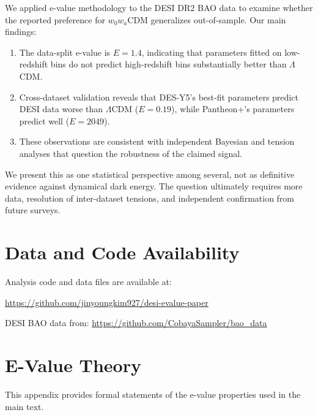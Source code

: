 \documentclass[11pt,a4paper]{article}
\newcommand{\LCDM}{$\Lambda$CDM}
\begin{document}
We applied e-value methodology to the DESI DR2 BAO data to examine whether the reported preference for $w_0w_a$CDM generalizes out-of-sample. Our main findings:

\begin{enumerate}
    \item The data-split e-value is $E = 1.4$, indicating that parameters fitted on low-redshift bins do not predict high-redshift bins substantially better than \LCDM.

    \item Cross-dataset validation reveals that DES-Y5's best-fit parameters predict DESI data worse than \LCDM{} ($E = 0.19$), while Pantheon+'s parameters predict well ($E = 2049$).

    \item These observations are consistent with independent Bayesian \citep{OngBayesian2025} and tension \citep{WangMota2025} analyses that question the robustness of the claimed signal.
\end{enumerate}

We present this as one statistical perspective among several, not as definitive evidence against dynamical dark energy. The question ultimately requires more data, resolution of inter-dataset tensions, and independent confirmation from future surveys.

\section*{Data and Code Availability}

Analysis code and data files are available at:
\begin{center}
\url{https://github.com/jinyoungkim927/desi-evalue-paper}
\end{center}

DESI BAO data from: \url{https://github.com/CobayaSampler/bao_data}

\appendix
\section{E-Value Theory}
\label{app:proofs}

This appendix provides formal statements of the e-value properties used in the main text.
\end{document}
